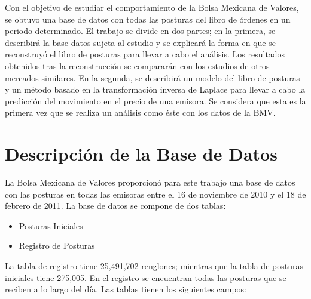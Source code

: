 \documentclass[11pt]{article}
\numberwithin{equation}{section} %
\begin{document}
Con el objetivo de estudiar el comportamiento de la Bolsa Mexicana de Valores, se obtuvo una base de datos con todas las posturas del libro de órdenes en un periodo determinado. El trabajo se divide en dos partes; en la primera, se describirá la base datos sujeta al estudio y se explicará la forma en que se reconstruyó el libro de posturas para llevar a cabo el análisis. Los resultados obtenidos tras la reconstrucción se compararán con los estudios de otros mercados similares. En la segunda, se describirá un modelo del libro de posturas y un método basado en la transformación inversa de Laplace para llevar a cabo la predicción del movimiento en el precio de una emisora. Se considera que esta es la primera vez que se realiza un análisis como éste con los datos de la BMV.

\clearpage

\section{Descripción de la Base de Datos}
La Bolsa Mexicana de Valores proporcionó para este trabajo una base de datos con las posturas en todas las emisoras entre el 16 de noviembre de 2010 y el 18 de febrero de 2011. La base de datos se compone de dos tablas:

\begin{itemize}
  \item Posturas Iniciales
  \item Registro de Posturas
\end{itemize}

La tabla de registro tiene 25,491,702 renglones; mientras que la tabla de posturas iniciales tiene 275,005. En el registro se encuentran todas las posturas que se reciben a lo largo del día. Las tablas tienen los siguientes campos:\\
\end{document}
